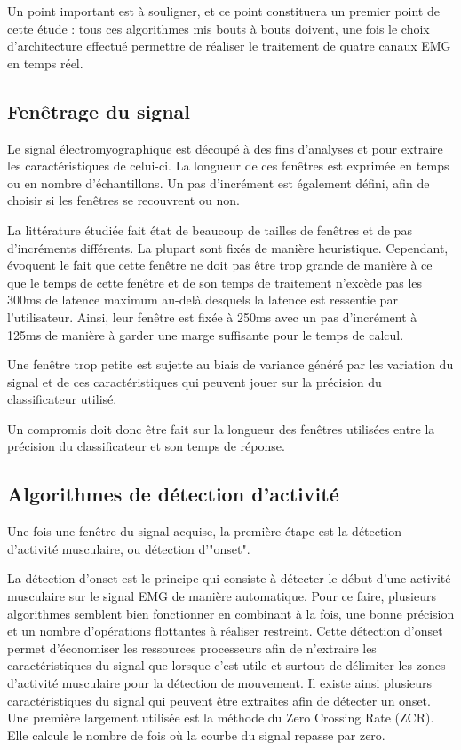 \documentclass[letterpaper, twoside, 12pt, memoire, creativecommons, hyperref]{thETS}
\begin{document}
Un point important est à souligner, et ce point constituera un premier point de cette étude : tous ces algorithmes mis bouts à bouts doivent, une fois le choix d’architecture effectué permettre de réaliser le traitement de quatre canaux EMG en temps réel.

\subsection{Fenêtrage du signal}

Le signal électromyographique est découpé à des fins d'analyses et pour extraire les caractéristiques de celui-ci. La longueur de ces fenêtres est exprimée en temps ou en nombre d'échantillons. Un pas d’incrément est également défini, afin de choisir si les fenêtres se recouvrent ou non. 

La littérature étudiée fait état de beaucoup de tailles de fenêtres et de pas d’incréments différents. La plupart sont fixés de manière heuristique. Cependant, \cite{Englehart2003} évoquent le fait que cette fenêtre ne doit pas être trop grande de manière à ce que le temps de cette fenêtre et de son temps de traitement n’excède pas les 300ms de latence maximum au-delà desquels la latence est ressentie par l’utilisateur. Ainsi, leur fenêtre est fixée à 250ms avec un pas d’incrément à 125ms de manière à garder une marge suffisante pour le temps de calcul. 

Une fenêtre trop petite est sujette au biais de variance généré par les variation du signal et de ces caractéristiques qui peuvent jouer sur la précision du classificateur utilisé.

Un compromis doit donc être fait sur la longueur des fenêtres utilisées entre la  précision du classificateur et son temps de réponse.

\subsection{Algorithmes de détection d'activité}

Une fois une fenêtre du signal acquise, la première étape est la détection d'activité musculaire, ou détection d'"onset". 

La détection d’onset est le principe qui consiste à détecter le début d’une activité musculaire sur le signal EMG de manière automatique.  Pour ce faire, plusieurs algorithmes semblent bien fonctionner en combinant à la fois, une bonne précision et un nombre d’opérations flottantes à réaliser restreint. Cette détection d’onset permet d’économiser les ressources processeurs afin  de n’extraire les caractéristiques du signal que lorsque c’est utile et surtout de délimiter les zones d’activité musculaire pour la détection de mouvement. 
Il existe ainsi plusieurs caractéristiques du signal qui peuvent être extraites afin de détecter un onset. Une première largement utilisée \citep{Chang1996, Englehart2003, Tenore2007}est la méthode du Zero Crossing Rate (ZCR). Elle calcule le nombre de fois où la courbe du signal repasse par zero. 
\end{document}
